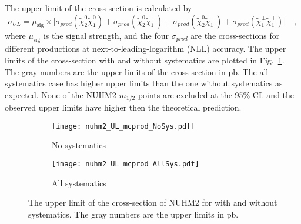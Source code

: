 The upper limit of the cross-section is calculated by
%
\begin{equation}
	\sigma_{UL} = \mu_\mathrm{sig} \times \big[ \sigma_{prod}(\widetilde{\chi}^{0}_{2} \widetilde{\chi}^{0}_{1}) + \sigma_{prod}(\widetilde{\chi}^{0}_{2} \widetilde{\chi}^{+}_{1}) + \sigma_{prod}(\widetilde{\chi}^{0}_{2} \widetilde{\chi}^{-}_{1}) + \sigma_{prod}(\widetilde{\chi}^{\pm}_{1} \widetilde{\chi}^{\mp}_{1}) \big] \quad ,
\end{equation}
%
where $\mu_\mathrm{sig}$ is the signal strength, and the four $\sigma_{prod}$ are the cross-sections for different productions at next-to-leading-logarithm (NLL) accuracy.
The upper limits of the cross-section with and without systematics are plotted in Fig.~\ref{fig:results_nuhm2_interpretation_mc_production}.
The gray numbers are the upper limits of the cross-section in pb.
The all systematics case has higher upper limits than the one without systematics as expected.
None of the NUHM2 $m_{1/2}$ points are excluded at the 95\% CL and the observed upper limits have higher then the theoretical prediction.

\begin{figure}[htbp]
    \begin{center}
        \begin{subfigure}[b]{0.48\textwidth}
            \texttt{[image: nuhm2\_UL\_mcprod\_NoSys.pdf]}
            \caption{No systematics}
        \end{subfigure}
        \begin{subfigure}[b]{0.48\textwidth}
            \texttt{[image: nuhm2\_UL\_mcprod\_AllSys.pdf]}
            \caption{All systematics}
        \end{subfigure}
    \end{center}
    \caption{The upper limit of the cross-section of NUHM2 for with and without systematics.
    The gray numbers are the upper limits in pb.}
    \label{fig:results_nuhm2_interpretation_mc_production}
\end{figure}
